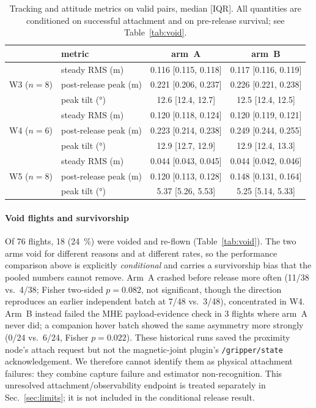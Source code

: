 \begin{table}[t]
\caption{Tracking and attitude metrics on valid pairs, median [IQR]. All quantities are
conditioned on successful attachment and on pre-release survival; see Table~\ref{tab:void}.}
\label{tab:autoperf}
\centering
\footnotesize
\begin{tabular}{@{}llcc@{}}
\toprule
 & metric & arm~A & arm~B \\
\midrule
\multirow{3}{*}{W3 ($n{=}8$)}
 & steady RMS (\si{m})      & 0.116 [0.115, 0.118] & 0.117 [0.116, 0.119] \\
 & post-release peak (\si{m}) & 0.221 [0.206, 0.237] & 0.226 [0.221, 0.238] \\
 & peak tilt (\si{\degree})  & 12.6 [12.4, 12.7] & 12.5 [12.4, 12.5] \\
\midrule
\multirow{3}{*}{W4 ($n{=}6$)}
 & steady RMS (\si{m})      & 0.120 [0.118, 0.124] & 0.120 [0.119, 0.121] \\
 & post-release peak (\si{m}) & 0.223 [0.214, 0.238] & 0.249 [0.244, 0.255] \\
 & peak tilt (\si{\degree})  & 12.9 [12.7, 12.9] & 12.9 [12.4, 13.3] \\
\midrule
\multirow{3}{*}{W5 ($n{=}8$)}
 & steady RMS (\si{m})      & 0.044 [0.043, 0.045] & 0.044 [0.042, 0.046] \\
 & post-release peak (\si{m}) & 0.120 [0.113, 0.128] & 0.148 [0.131, 0.164] \\
 & peak tilt (\si{\degree})  & 5.37 [5.26, 5.53] & 5.25 [5.14, 5.33] \\
\bottomrule
\end{tabular}
\end{table}

\paragraph{Void flights and survivorship} Of 76 flights, 18 (\SI{24}{\percent}) were voided
and re-flown (Table~\ref{tab:void}). The two arms void for different reasons and at different
rates, so the performance comparison above is explicitly \emph{conditional} and carries a
survivorship bias that the pooled numbers cannot remove. Arm~A crashed before release more
often (11/38 vs.\ 4/38; Fisher two-sided $p=\num{0.082}$, not significant, though the
direction reproduces an earlier independent batch at 7/48 vs.\ 3/48), concentrated in W4.
Arm~B instead failed the MHE payload-evidence check in 3 flights where arm~A never did; a
companion hover batch showed the same asymmetry more strongly (0/24 vs.\ 6/24, Fisher
$p=\num{0.022}$). These historical runs saved the proximity node's attach request but not the
magnetic-joint plugin's \texttt{/gripper/state} acknowledgement. We therefore cannot identify
them as physical attachment failures: they combine capture failure and estimator
non-recognition. This unresolved attachment/observability endpoint is treated separately in
Sec.~\ref{sec:limits}; it is not included in the conditional release result.

